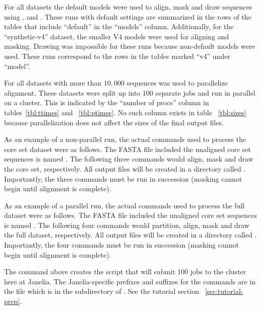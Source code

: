 For all datasets the default models were used to align, mask and draw
sequences using ,  and
. These runs with default settings are summarized in the
rows of the tables that include ``default'' in the ``models'' column.
Additionally, for the ``synthetic-v4'' dataset, the smaller V4
models were used for aligning and masking. Drawing was impossible for
these runs because non-default models were used. These runs correspond
to the rows in the tables marked ``v4'' under ``model''.

For all datasets with more than $10,000$ sequences  was
used to parallelize alignment. These datasets were split up into $100$
separate jobs and run in parallel on a cluster. This is indicated by
the ``number of procs'' column in tables~\ref{tbl:ttimes} and
~\ref{tbl:ptimes}. No such column exists in table ~\ref{tbl:sizes} because
parallelization does not affect the sizes of the final output files.

As an example of a non-parallel run, the actual commands used to process the
 core set dataset were as follows. The FASTA file
included the unaligned core set sequences is named . The
following three commands would align, mask and draw the core
set, respectively. All output files will be created in a directory called
. Importantly, the three commands  must be run in succession
(masking cannot begin until alignment is complete). 




As an example of a parallel run, the actual commands used to process the
 full dataset were as follows. The FASTA file
included the unaligned core set sequences is named . The
following four commands would partition, align, mask and draw the full
dataset, respectively. All output files will be created in a directory
called . Importantly, the four commands must be run in succession
(masking cannot begin until alignment is complete). 





The  command above creates the
 script that will submit 100 
jobs to the cluster here at Janelia. The Janelia-specific prefixes and
suffixes for the commands are in the file
 which is in the 
subdirectory of . See the tutorial section
~\ref{sec:tutorial-prep}.

